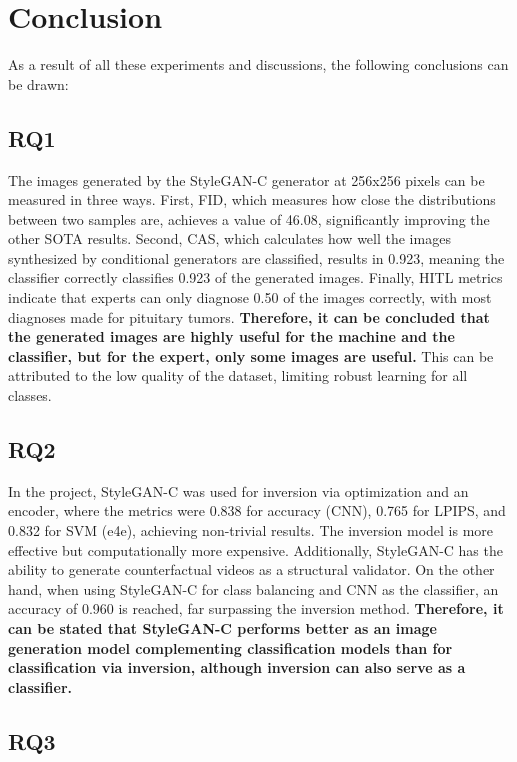 \chapter{Conclusion}


As a result of all these experiments and discussions, the following conclusions can be drawn:



\section{RQ1}

The images generated by the StyleGAN-C generator at 256x256 pixels can be measured in three ways. First, FID, which measures how close the distributions between two samples are, achieves a value of 46.08, significantly improving the other SOTA results. Second, CAS, which calculates how well the images synthesized by conditional generators are classified, results in 0.923, meaning the classifier correctly classifies 0.923 of the generated images. Finally, HITL metrics indicate that experts can only diagnose 0.50 of the images correctly, with most diagnoses made for pituitary tumors. \textbf{Therefore, it can be concluded that the generated images are highly useful for the machine and the classifier, but for the expert, only some images are useful.} This can be attributed to the low quality of the dataset, limiting robust learning for all classes.

\section{RQ2}

In the project, StyleGAN-C was used for inversion via optimization and an encoder, where the metrics were 0.838 for accuracy (CNN), 0.765 for LPIPS, and 0.832 for SVM (e4e), achieving non-trivial results. The inversion model is more effective but computationally more expensive. Additionally, StyleGAN-C has the ability to generate counterfactual videos as a structural validator. On the other hand, when using StyleGAN-C for class balancing and CNN as the classifier, an accuracy of 0.960 is reached, far surpassing the inversion method. \textbf{Therefore, it can be stated that StyleGAN-C performs better as an image generation model complementing classification models than for classification via inversion, although inversion can also serve as a classifier.}

\section{RQ3}

